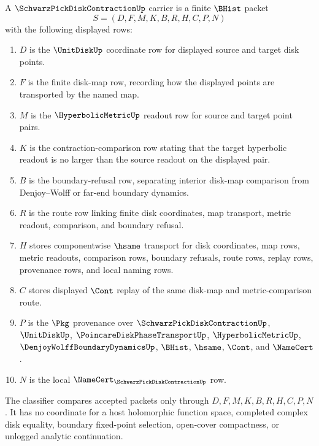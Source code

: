 \begin{definition}
\label{def:schwarz-pick-disk-contraction-carrier}
A $\SchwarzPickDiskContractionUp$ carrier is a finite $\BHist$ packet
$$
S=(D,F,M,K,B,R,H,C,P,N)
$$
with the following displayed rows:
\begin{enumerate}
\item $D$ is the $\UnitDiskUp$ coordinate row for displayed source and target disk points.
\item $F$ is the finite disk-map row, recording how the displayed points are transported by the named map.
\item $M$ is the $\HyperbolicMetricUp$ readout row for source and target point pairs.
\item $K$ is the contraction-comparison row stating that the target hyperbolic readout is no larger than the source readout on the displayed pair.
\item $B$ is the boundary-refusal row, separating interior disk-map comparison from Denjoy--Wolff or far-end boundary dynamics.
\item $R$ is the route row linking finite disk coordinates, map transport, metric readout, comparison, and boundary refusal.
\item $H$ stores componentwise $\hsame$ transport for disk coordinates, map rows, metric readouts, comparison rows, boundary refusals, route rows, replay rows, provenance rows, and local naming rows.
\item $C$ stores displayed $\Cont$ replay of the same disk-map and metric-comparison route.
\item $P$ is the $\Pkg$ provenance over $\SchwarzPickDiskContractionUp$, $\UnitDiskUp$, $\PoincareDiskPhaseTransportUp$, $\HyperbolicMetricUp$, $\DenjoyWolffBoundaryDynamicsUp$, $\BHist$, $\hsame$, $\Cont$, and $\NameCert$.
\item $N$ is the local $\NameCert_{\SchwarzPickDiskContractionUp}$ row.
\end{enumerate}
The classifier compares accepted packets only through $D,F,M,K,B,R,H,C,P,N$. It has no coordinate for a host holomorphic function space, completed complex disk equality, boundary fixed-point selection, open-cover compactness, or unlogged analytic continuation.
\end{definition}

